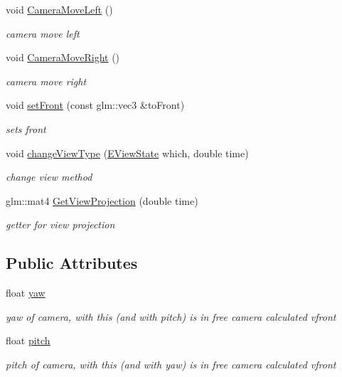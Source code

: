 \begin{DoxyCompactItemize}
void \mbox{\hyperlink{class_c_camera_a7649ce213b5baaae9dcb0d17776e8606}{Camera\+Move\+Left}} ()
\begin{DoxyCompactList}\small\item\em camera move left \end{DoxyCompactList}\item 
void \mbox{\hyperlink{class_c_camera_a80dc9119218e8f6fcd9c827a40c63e33}{Camera\+Move\+Right}} ()
\begin{DoxyCompactList}\small\item\em camera move right \end{DoxyCompactList}\item 
void \mbox{\hyperlink{class_c_camera_aecabdd595f7051f0780374f8970279ee}{set\+Front}} (const glm\+::vec3 \&to\+Front)
\begin{DoxyCompactList}\small\item\em sets front \end{DoxyCompactList}\item 
void \mbox{\hyperlink{class_c_camera_af19e4ea1747a31e2b1d6c4a3432aea03}{change\+View\+Type}} (\mbox{\hyperlink{class_c_camera_ae03c923f302a1ff2a7f85044b7352229}{E\+View\+State}} which, double time)
\begin{DoxyCompactList}\small\item\em change view method \end{DoxyCompactList}\item 
glm\+::mat4 \mbox{\hyperlink{class_c_camera_a0aeb916be4aa684dc2458a48ae22ff8d}{Get\+View\+Projection}} (double time)
\begin{DoxyCompactList}\small\item\em getter for view projection \end{DoxyCompactList}\end{DoxyCompactItemize}
\subsection*{Public Attributes}
\begin{DoxyCompactItemize}
\item 
float \mbox{\hyperlink{class_c_camera_a0a0488eeda9bcd1e4f9eff6d2029554a}{yaw}}
\begin{DoxyCompactList}\small\item\em yaw of camera, with this (and with pitch) is in free camera calculated vfront \end{DoxyCompactList}\item 
float \mbox{\hyperlink{class_c_camera_aecb3cfc8655a1891fa67c037b34d7c8a}{pitch}}
\begin{DoxyCompactList}\small\item\em pitch of camera, with this (and with yaw) is in free camera calculated vfront \end{DoxyCompactList}\end{DoxyCompactItemize}


